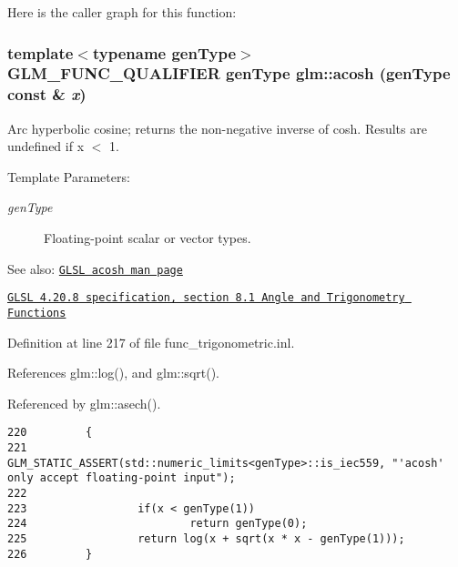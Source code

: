 Here is the caller graph for this function:\hypertarget{group__core__func__trigonometric_g7d91deddd26925a390f08448a1b9ab1a}{
\subsubsection[acosh]{\setlength{\rightskip}{0pt plus 5cm}template$<$typename genType$>$ GLM\_\-FUNC\_\-QUALIFIER genType glm::acosh (genType const \& {\em x})}}
\label{group__core__func__trigonometric_g7d91deddd26925a390f08448a1b9ab1a}


Arc hyperbolic cosine; returns the non-negative inverse of cosh. Results are undefined if x $<$ 1.

\begin{Desc}
\item[Template Parameters:]
\begin{description}
\item[{\em genType}]Floating-point scalar or vector types.\end{description}
\end{Desc}
\begin{Desc}
\item[See also:]\href{http://www.opengl.org/sdk/docs/manglsl/xhtml/acosh.xml}{\tt GLSL acosh man page} 

\href{http://www.opengl.org/registry/doc/GLSLangSpec.4.20.8.pdf}{\tt GLSL 4.20.8 specification, section 8.1 Angle and Trigonometry Functions} \end{Desc}


Definition at line 217 of file func\_\-trigonometric.inl.

References glm::log(), and glm::sqrt().

Referenced by glm::asech().

\begin{Code}\begin{verbatim}220         {
221                 GLM_STATIC_ASSERT(std::numeric_limits<genType>::is_iec559, "'acosh' only accept floating-point input");
222 
223                 if(x < genType(1))
224                         return genType(0);
225                 return log(x + sqrt(x * x - genType(1)));
226         }
\end{verbatim}
\end{Code}




